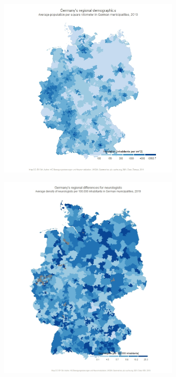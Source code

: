 \documentclass{bmcart}
\begin{document}
\begin{backmatter}
\begin{figure}[h!]
\begin{subfigure}[b]{0.35\linewidth}
        \includegraphics[width=.90\textwidth]{population.perskmGER.jpeg}
        \label{fig1:population}
    \end{subfigure}%
    \begin{subfigure}[b]{0.35\linewidth}
        \includegraphics[width=.90\textwidth]{neurologists.10122021.jpeg}

\end{subfigure}
\end{figure}
\end{backmatter}
\end{document}
